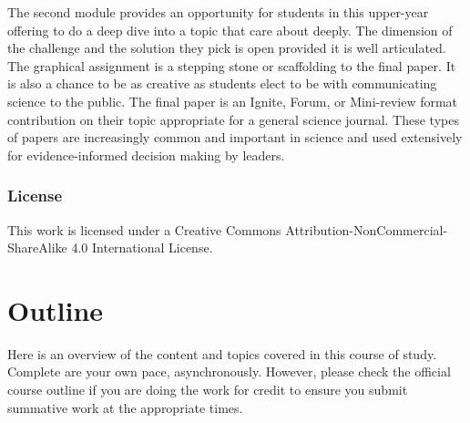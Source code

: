 \documentclass[
]{book}
\begin{document}
The second module provides an opportunity for students in this upper-year offering to do a deep dive into a topic that care about deeply. The dimension of the challenge and the solution they pick is open provided it is well articulated. The graphical assignment is a stepping stone or scaffolding to the final paper. It is also a chance to be as creative as students elect to be with communicating science to the public. The final paper is an Ignite, Forum, or Mini-review format contribution on their topic appropriate for a general science journal. These types of papers are increasingly common and important in science and used extensively for evidence-informed decision making by leaders.

\hypertarget{license}{%
\subsection*{License}\label{license}}

This work is licensed under a Creative Commons Attribution-NonCommercial-ShareAlike 4.0 International License.

\hypertarget{outline}{%
\chapter{Outline}\label{outline}}

Here is an overview of the content and topics covered in this course of study. Complete are your own pace, asynchronously. However, please check the official course outline if you are doing the work for credit to ensure you submit summative work at the appropriate times.
\end{document}

